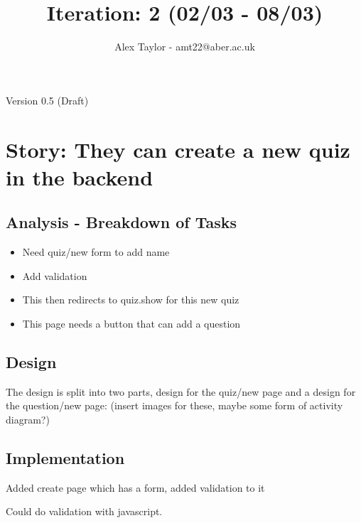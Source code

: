 \documentclass{article}
\title{Iteration: 2 (02/03 - 08/03)}
\author{Alex Taylor - amt22@aber.ac.uk}
\begin{document}
\maketitle
\begin{center}
	Version 0.5 (Draft)
\end{center}
\tableofcontents
\thispagestyle{empty}
\newpage

\section{Story: They can create a new quiz in the backend}
\subsection{Analysis - Breakdown of Tasks}
\begin{itemize}
	\item Need quiz/new form to add name
	\item Add validation
	\item This then redirects to quiz.show for this new quiz
	\item This page needs a button that can add a question
\end{itemize}
\subsection{Design}
The design is split into two parts, design for the quiz/new page and a design for the question/new page:
(insert images for these, maybe some form of activity diagram?)
\subsection{Implementation}
Added create page which has a form, added validation to it

Could do validation with javascript.
\end{document}
